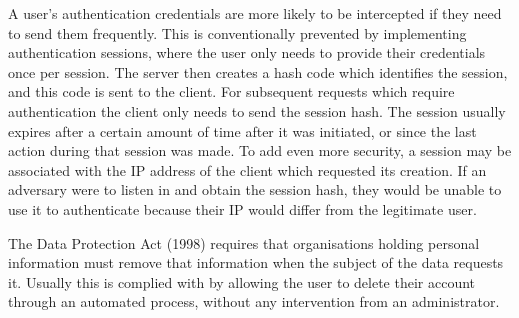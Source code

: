 		A user's authentication credentials are more likely to be intercepted if they need to send them frequently. This is conventionally prevented by implementing authentication sessions, where the user only needs to provide their credentials once per session. The server then creates a hash code which identifies the session, and this code is sent to the client. For subsequent requests which require authentication the client only needs to send the session hash. The session usually expires after a certain amount of time after it was initiated, or since the last action during that session was made. To add even more security, a session may be associated with the IP address of the client which requested its creation. If an adversary were to listen in and obtain the session hash, they would be unable to use it to authenticate because their IP would differ from the legitimate user.

		The Data Protection Act (1998) requires that organisations holding personal information must remove that information when the subject of the data requests it\cite{dpa1998}. Usually this is complied with by allowing the user to delete their account through an automated process, without any intervention from an administrator.
